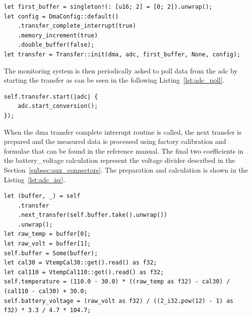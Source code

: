 \begin{lstlisting}[caption={Configuration of the DMA controller for ADC transfers.},label=lst:dma]
let first_buffer = singleton!(: [u16; 2] = [0; 2]).unwrap();
let config = DmaConfig::default()
    .transfer_complete_interrupt(true)
    .memory_increment(true)
    .double_buffer(false);
let transfer = Transfer::init(dma, adc, first_buffer, None, config);
\end{lstlisting}

The monitoring system is then periodically asked to poll data from the \acs{adc} by starting the transfer as can be seen in the following Listing~\ref{lst:adc_poll}.
\begin{lstlisting}[caption={Polling the ADC.},label=lst:adc_poll]
self.transfer.start(|adc| {
    adc.start_conversion();
});
\end{lstlisting}
When the \acs{dma} transfer complete interrupt routine is called, the next transfer is prepared and the measured data is processed using factory calibration and formulae that can be found in the reference manual\cite{stmicro_stm32f405xx_2020}.
The final two coefficients in the battery\_voltage calculation represent the voltage divider described in the Section~\ref{subsec:aux_connectors}.
The preparation and calculation is shown in the Listing~\ref{lst:adc_isr}.
\begin{lstlisting}[caption={Processing the data measured by the ADC.},label=lst:adc_isr]
let (buffer, _) = self
    .transfer
    .next_transfer(self.buffer.take().unwrap())
    .unwrap();
let raw_temp = buffer[0];
let raw_volt = buffer[1];
self.buffer = Some(buffer);
let cal30 = VtempCal30::get().read() as f32;
let cal110 = VtempCal110::get().read() as f32;
self.temperature = (110.0 - 30.0) * ((raw_temp as f32) - cal30) / (cal110 - cal30) + 30.0;
self.battery_voltage = (raw_volt as f32) / ((2_i32.pow(12) - 1) as f32) * 3.3 / 4.7 * 104.7;
\end{lstlisting}


